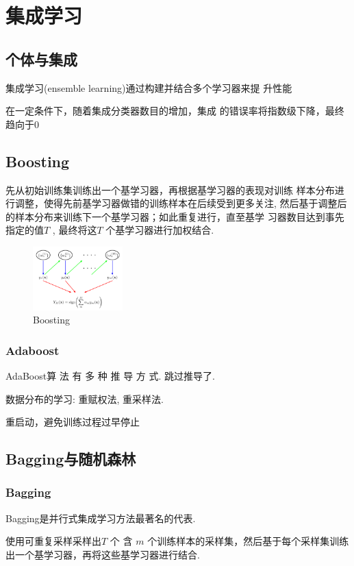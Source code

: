\newpage
\section{集成学习}

\subsection{个体与集成}
集成学习(ensemble learning)通过构建并结合多个学习器来提
升性能

在一定条件下，随着集成分类器数目的增加，集成
的错误率将指数级下降，最终趋向于0


\subsection{Boosting}
先从初始训练集训练出一个基学习器，再根据基学习器的表现对训练
样本分布进行调整，使得先前基学习器做错的训练样本在后续受到更多关注,
然后基于调整后的样本分布来训练下一个基学习器；如此重复进行，直至基学
习器数目达到事先指定的值$T$ , 最终将这$T$ 个基学习器进行加权结合.

\begin{figure}[!htb]
    \centering
    \includegraphics[width=0.309\textwidth]{pic/ML8/Boosting}
    \caption{Boosting}
\end{figure}

\subsubsection{Adaboost}
AdaBoost算 法 有 多 种 推 导 方 式. 跳过推导了. 

数据分布的学习: 重赋权法, 重采样法. 

重启动，避免训练过程过早停止

\subsection{Bagging与随机森林}
\subsubsection{Bagging}
Bagging是并行式集成学习方法最著名的代表. 

使用可重复采样采样出$T$ 个 含 $m$ 个训练样本的采样集，然后基于每个采样集训练出一个基学习器，再将这些基学习器进行结合.

